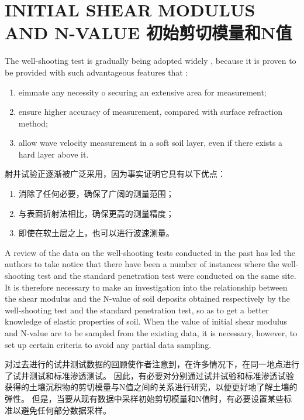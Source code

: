 \section{INITIAL SHEAR MODULUS AND N-VALUE 初始剪切模量和N值}

\begin{paracol}{2}
    
    The well-shooting test is gradually being adopted widely , because it is proven to be provided with such advantageous features that : 
    \begin{enumerate}
        \item eimmate any necessity o securing an extensive area for measurement;
        \item ensure higher accuracy of measurement, compared with surface refraction method;
        \item allow wave velocity measurement in a soft soil layer, even if there exists a hard layer above it.
    \end{enumerate}

    \switchcolumn

    射井试验正逐渐被广泛采用，因为事实证明它具有以下优点：
    \begin{enumerate}
        \item 消除了任何必要，确保了广阔的测量范围；
        \item 与表面折射法相比，确保更高的测量精度；
        \item 即使在软土层之上，也可以进行波速测量。
    \end{enumerate}

    \switchcolumn*

    A review of the data on the well-shooting tests conducted in the past has led the authors to take notice that there have been a number of instances where the well-shooting test and the standard penetration test were conducted on the same site. It is therefore necessary to make an investigation into the relationship between the shear modulus and the N-value of soil deposits obtained respectively by the well-shooting test and the standard penetration test, so as to get a better knowledge of elastic properties of soil. When the value of initial shear modulus and N-value are to be sampled from the existing data, it is necessary, however, to set up certain criteria to avoid any partial data sampling.

    \switchcolumn

    对过去进行的试井测试数据的回顾使作者注意到，在许多情况下，在同一地点进行了试井测试和标准渗透测试。 因此，有必要对分别通过试井试验和标准渗透试验获得的土壤沉积物的剪切模量与N值之间的关系进行研究，以便更好地了解土壤的弹性。 但是，当要从现有数据中采样初始剪切模量和N值时，有必要设置某些标准以避免任何部分数据采样。

\end{paracol}

